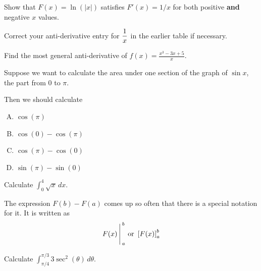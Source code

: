 \newpage

 Show that $F(x) = \ln(|x|)$ satisfies $F'(x) = 1/x$ for
  both positive {\bf and} negative $x$ values.
\vfill

 Correct your anti-derivative entry for $\displaystyle \frac{1}{x}$
  in the earlier table if necessary.


\newpage
\begin{problem} 
Find the most general anti-derivative of $\displaystyle f(x)=\frac{x^3-3x+5}{x}$.

\end{problem}

\newpage

\begin{problem}
Suppose we want to calculate the area under one section of the graph
of $\sin x$, the part from 0 to $\pi$.
\begin{center}
\end{center}
Then we should calculate
\begin{enumerate}[A.]
\item $\cos(\pi)$ \\[2ex]
\item $\cos(0) - \cos (\pi)$ \\[2ex]
\item $\cos(\pi)-\cos (0)$ \\[2ex]
\item $\sin(\pi)-\sin(0)$
\end{enumerate}
\end{problem}

\newpage
\begin{problem}
Calculate $\displaystyle \int_0^4 \sqrt{x}\,dx$.

\end{problem}

\newpage
{}\medskip

\noindent The expression $F(b)-F(a)$ comes up so often that there is a special
notation for it.  It is written as
$$F(x)\Bigg\arrowvert_a^b \text{ or } \left[ F(x) \right]_a^b$$ 


\begin{problem}
Calculate $\displaystyle \int_{\pi/4}^{\pi/3} 3 \sec^2 (\theta) \, d \theta$.
 
\end{problem}

